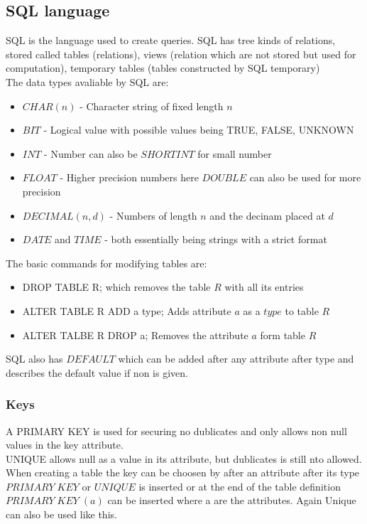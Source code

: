 \documentclass[12pt, a4paper]{article}
\begin{document}
		\subsection{SQL language}
			SQL is the language used to create queries. SQL has tree kinds of relations, stored called tables (relations), views (relation which are not stored but used for computation), temporary tables (tables constructed by SQL temporary)\\
			The data types avaliable by SQL are:
			\begin{itemize}
				\item $CHAR(n)$ - Character string of fixed length $n$
				\item $BIT$ - Logical value with possible values being TRUE, FALSE, UNKNOWN
				\item $INT$ - Number can also be $SHORTINT$ for small number
				\item $FLOAT$ - Higher precision numbers here $DOUBLE$ can also be used for more precision
				\item $DECIMAL(n,d)$ - Numbers of length $n$ and the decinam placed at $d$
				\item $DATE$ and $TIME$ - both essentially being strings with a strict format
			\end{itemize}
			The basic commands for modifying tables are:
			\begin{itemize}
				\item DROP TABLE R; which removes the table $R$ with all its entries
				\item ALTER TABLE R ADD a type; Adds attribute $a$ as a $type$ to table $R$
				\item ALTER TALBE R DROP a; Removes the attribute $a$ form table $R$
			\end{itemize}
			SQL also has $DEFAULT$ which can be added after any attribute after type and describes the default value if non is given.\\
			\subsubsection{Keys}
				A PRIMARY KEY is used for securing no dublicates and only allows non null values in the key attribute.\\
				UNIQUE allows null as a value in its attribute, but dublicates is still nto allowed.\\
				When creating a table the key can be choosen by after an attribute after its type $PRIMARY\; KEY$ or $UNIQUE$ is inserted or at the end of the table definition $PRIMARY\; KEY\; (a)$ can be inserted where a are the attributes. Again Unique can also be used like this.
\end{document}
